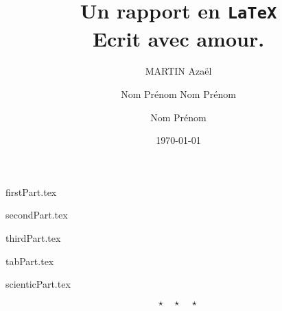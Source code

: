\documentclass{rUTT}
\title{
    Un rapport en \texttt{\LaTeX} \\
    Ecrit avec amour.
    }
\date{\today}
\author{
    {\sc MARTIN} Azaël
    \and
    {\sc Nom} Prénom
    \break
    {\sc Nom} Prénom
    \and
    {\sc Nom} Prénom
    \break
    }
\begin{document}
    \frontpage
    \tableofcontents %
    \listoffigures
    \listoftables

    \clearpage

    \justifying

    {firstPart.tex}

    \clearpage

    {secondPart.tex}

    \clearpage

    {thirdPart.tex}

    \clearpage

    {tabPart.tex}

    \clearpage

    {scienticPart.tex}


    \medskip %

    \[ \star \quad \star \quad \star \]

    \nocite{*} %

    {
    \RaggedRight %
    \sloppy
    \printbibliography[title={Bibliographie}]
    }
\end{document}
